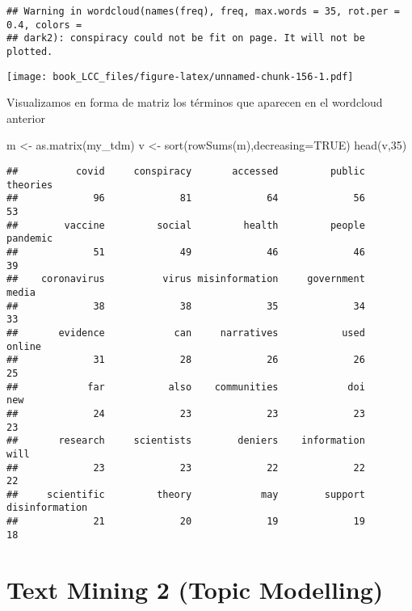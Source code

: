 \documentclass[
]{book}
\newenvironment{Shaded}{\begin{snugshade}}{\end{snugshade}}
\newcommand{\AttributeTok}[1]{\textcolor[rgb]{0.77,0.63,0.00}{#1}}
\newcommand{\ConstantTok}[1]{\textcolor[rgb]{0.00,0.00,0.00}{#1}}
\newcommand{\DecValTok}[1]{\textcolor[rgb]{0.00,0.00,0.81}{#1}}
\newcommand{\FunctionTok}[1]{\textcolor[rgb]{0.00,0.00,0.00}{#1}}
\newcommand{\NormalTok}[1]{#1}
\newcommand{\OtherTok}[1]{\textcolor[rgb]{0.56,0.35,0.01}{#1}}
\begin{document}
\begin{verbatim}
## Warning in wordcloud(names(freq), freq, max.words = 35, rot.per = 0.4, colors =
## dark2): conspiracy could not be fit on page. It will not be plotted.
\end{verbatim}

\texttt{[image: book\_LCC\_files/figure-latex/unnamed-chunk-156-1.pdf]}

Visualizamos en forma de matriz los términos que aparecen en el wordcloud anterior

\begin{Shaded}
\begin{Highlighting}[]
\NormalTok{m }\OtherTok{\textless{}{-}} \FunctionTok{as.matrix}\NormalTok{(my\_tdm)}
\NormalTok{v }\OtherTok{\textless{}{-}} \FunctionTok{sort}\NormalTok{(}\FunctionTok{rowSums}\NormalTok{(m),}\AttributeTok{decreasing=}\ConstantTok{TRUE}\NormalTok{)}
\FunctionTok{head}\NormalTok{(v,}\DecValTok{35}\NormalTok{)}
\end{Highlighting}
\end{Shaded}

\begin{verbatim}
##          covid     conspiracy       accessed         public       theories 
##             96             81             64             56             53 
##        vaccine         social         health         people       pandemic 
##             51             49             46             46             39 
##    coronavirus          virus misinformation     government          media 
##             38             38             35             34             33 
##       evidence            can     narratives           used         online 
##             31             28             26             26             25 
##            far           also    communities            doi            new 
##             24             23             23             23             23 
##       research     scientists        deniers    information           will 
##             23             23             22             22             22 
##     scientific         theory            may        support disinformation 
##             21             20             19             19             18
\end{verbatim}

\hypertarget{text-mining-2-topic-modelling}{%
\section{Text Mining 2 (Topic Modelling)}\label{text-mining-2-topic-modelling}}
\end{document}

